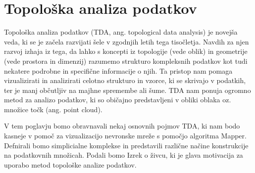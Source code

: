 \chapter{Topološka analiza podatkov}
Topološka analiza podatkov (TDA, ang. topological data analysis) je novejša veda, ki se je začela razvijati šele v zgodnjih letih tega tisočletja. Navdih za njen razvoj izhaja iz tega, da lahko s koncepti iz topologije (vede oblik) in geometrije (vede prostora in dimenzij)  razumemo strukturo kompleksnih podatkov kot tudi nekatere podrobne in specifične informacije o njih. Ta pristop nam pomaga vizualizirati in analizirati celotno strukturo in vzorce, ki se skrivajo v podatkih, ter je manj občutljiv na majhne spremembe ali šume. TDA nam ponuja ogromno metod za analizo podatkov, ki so običajno predstavljeni v obliki oblaka oz. množice točk (ang. point cloud).

V tem poglavju bomo obravnavali nekaj osnovnih pojmov TDA, ki nam bodo kasneje v pomoč za vizualizacijo nevronske mreže s pomočjo algoritma Mapper. Defnirali bomo simplicialne komplekse in predstavili različne načine konstrukcije na podatkovnih množicah. Podali bomo Izrek o živcu, ki je glava motivacija za uporabo metod topološke analize podatkov.



